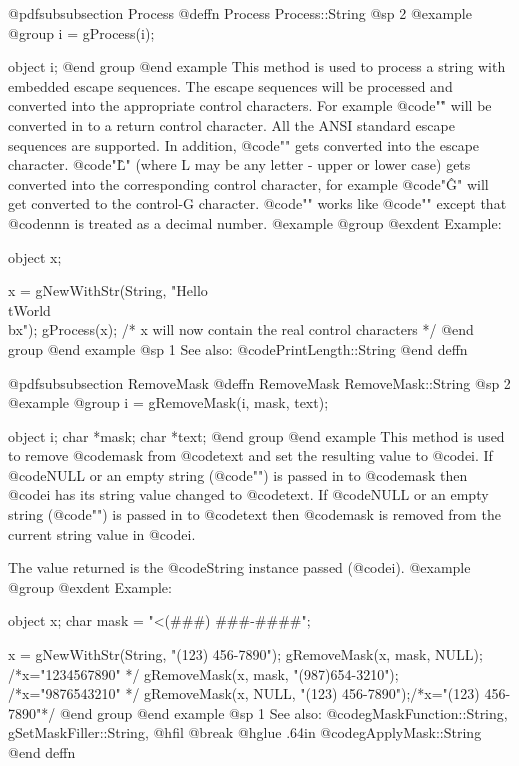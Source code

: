 @pdfsubsubsection {Process}
@deffn {Process} Process::String
@sp 2
@example
@group
i = gProcess(i);

object  i;
@end group
@end example
This method is used to process a string with embedded escape sequences.
The escape sequences will be processed and converted into the appropriate
control characters.  For example @code{"\r"} will be converted in to a return
control character.  All the ANSI standard escape sequences are supported.
In addition, @code{"\e"} gets converted into the escape character.
@code{"\^L"} (where L may be any letter - upper or lower case) gets
converted into the corresponding control character, for example
@code{"\^G"} will get converted to the control-G character.
@code{"\dnnn"} works like @code{"\xnnn"} except that @code{nnn} is
treated as a decimal number.
@example
@group
@exdent Example:

object  x;

x = gNewWithStr(String, "Hello\\tWorld\\bx");
gProcess(x);
/*  x will now contain the real control characters  */
@end group
@end example
@sp 1
See also:  @code{PrintLength::String}
@end deffn













@pdfsubsubsection {RemoveMask}
@deffn {RemoveMask} RemoveMask::String
@sp 2
@example
@group
i = gRemoveMask(i, mask, text);

object  i;
char    *mask;
char    *text;
@end group
@end example
This method is used to remove @code{mask} from @code{text} and set the
resulting value to @code{i}.  If @code{NULL} or an empty string
(@code{""}) is passed in to @code{mask} then @code{i} has its string
value changed to @code{text}.  If @code{NULL} or an empty string
(@code{""}) is passed in to @code{text} then @code{mask} is removed from
the current string value in @code{i}.

The value returned is the @code{String} instance passed (@code{i}).
@example
@group
@exdent Example:

object  x;
char    mask = "<(###) ###-####";

x = gNewWithStr(String, "(123) 456-7890");
gRemoveMask(x, mask, NULL);            /*x="1234567890"    */
gRemoveMask(x, mask, "(987)654-3210"); /*x="9876543210"    */
gRemoveMask(x, NULL, "(123) 456-7890");/*x="(123) 456-7890"*/
@end group
@end example
@sp 1
See also:  @code{gMaskFunction::String, gSetMaskFiller::String,}
@hfil @break @hglue .64in      @code{gApplyMask::String}
@end deffn













